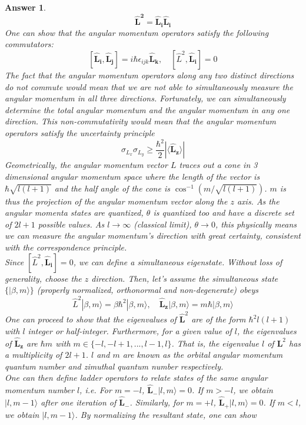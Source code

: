\documentclass[a4paper]{article}
\newtheorem{ans}{Answer}[subsection]
\theoremstyle{new}
\begin{document}
\begin{ans}
$$\mathbf{\hat{L}^2}=\mathbf{\hat{L}_i}\mathbf{\hat{L}_i}$$
One can show that the angular momentum operators satisfy the following commutators:
$$[\mathbf{\hat{L}_i},\mathbf{\hat{L}_j}]=i\hbar\epsilon_{ijk}\mathbf{\hat{L}_k},\quad [\hat{L}^2,\mathbf{\hat{L}_i}]=0$$
The fact that the angular momentum operators along any two distinct directions do not commute would mean that we are not able to simultaneously measure the angular momentum in all three directions. Fortunately, we can simultaneously determine the total angular momentum and the angular momentum in any one direction. This non-commutativity would mean that the angular momentum operators satisfy the uncertainty principle
$$\sigma_{L_x}\sigma_{L_y}\geq\frac{\hbar^2}{2}|\langle\mathbf{\hat{L}_z}\rangle|$$
Geometrically, the angular momentum vector $L$ traces out a cone in 3 dimensional angular momentum space where the length of the vector is $\hbar\sqrt{l(l+1)}$ and the half angle of the cone is $\cos^{-1}(m/\sqrt{l(l+1)})$.  $m$ is thus the projection of the angular momentum vector along the $z$ axis. As the angular momenta states are quantized, $\theta$ is quantized too and have a discrete set of $2l + 1$ possible values. As $l\rightarrow\infty$ (classical limit), $\theta\rightarrow 0$, this physically means we can measure the angular momentum's direction with great certainty, consistent with the correspondence principle.\\[5pt]
Since $[\hat{L}^2,\mathbf{\hat{L}_i}]=0$, we can define a simultaneous eigenstate. Without loss of generality, choose the $z$ direction. Then, let's assume the simultaneous state $\{|\beta,m\rangle\}$ (properly normalized, orthonormal and non-degenerate) obeys
$$\hat{L}^2|\beta,m\rangle=\beta\hbar^2|\beta,m\rangle,\quad \mathbf{\hat{L}_z}|\beta,m\rangle=m\hbar|\beta,m\rangle$$
One can proceed to show that the eigenvalues of $\mathbf{\hat{L}}^2$ are of the form $\hbar^2l(l+1)$ with $l$ integer or half-integer. Furthermore, for a given value of $l$, the eigenvalues of $\mathbf{\hat{L}_z}$ are $\hbar m$ with $m\in\{-l,-l+1,...,l-1,l\}$. That is, the eigenvalue $l$ of $\mathbf{L}^2$ has a multiplicity of $2l+1$. $l$ and $m$ are known as the orbital angular momentum quantum number and zimuthal quantum number respectively.\\[5pt]
One can then define ladder operators to relate states of the same angular momentum number $l$, i.e. For $m=-l$, $\mathbf{\hat{L}_-}|l,m\rangle=0$. If $m>-l$, we obtain $|l,m-1\rangle$ after one iteration of $\mathbf{\hat{L}_-}$. Similarly, for $m=+l$, $\mathbf{\hat{L}_+}|l,m\rangle=0$. If $m<l$, we obtain $|l,m-1\rangle$. By normalizing the resultant state, one can show 

\end{ans}
\end{document}

